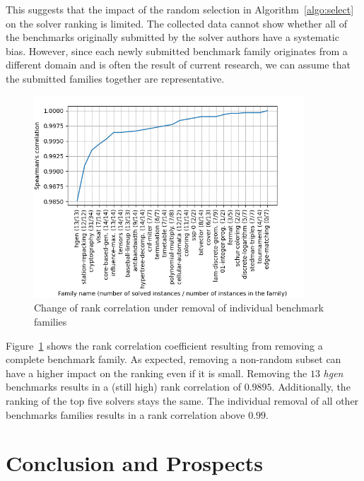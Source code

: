 \documentclass{elsarticle}
\begin{document}
This suggests that the impact of the random selection in Algorithm~\ref{algo:select} on the solver ranking is limited.
The collected data cannot show whether all of the benchmarks originally
submitted by the solver authors have a systematic bias. However, since each
newly submitted benchmark family originates from a different domain and is often
the result of current research, we can assume that the submitted families
together are representative.

\begin{figure}[t]
  \centering
  \includegraphics[width=0.9\textwidth]{stability/fam_leave_one_out_corr.png}
  \caption{Change of rank correlation under removal of individual benchmark families}
  \label{fig:sampleFamily}
\end{figure}

Figure~\ref{fig:sampleFamily} shows the rank
correlation coefficient resulting from removing a complete benchmark family. As expected, removing a non-random subset can have a
higher impact on the ranking even if it is small. Removing the $13$ \emph{hgen} benchmarks
results in a (still high) rank correlation of
$0.9895$. Additionally, the ranking of the top five solvers stays the same.
The individual removal of all other benchmarks families results in a rank correlation above $0.99$.

\section{Conclusion and Prospects}
\label{sec:conclusion}
\end{document}
